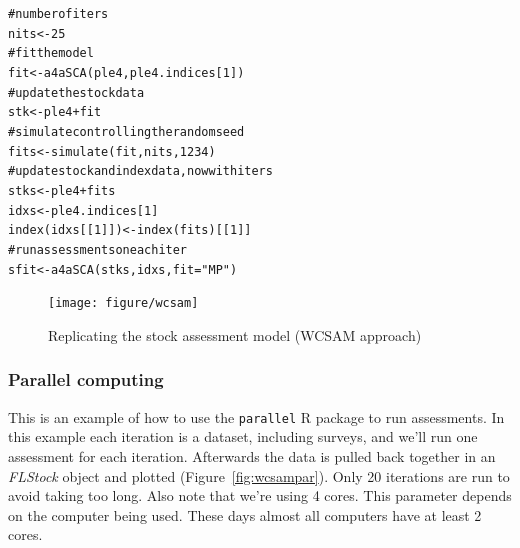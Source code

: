 \documentclass[a4paper,english,10pt]{article}\usepackage[]{graphicx}\usepackage[]{color}
\makeatletter
\newcommand{\hlnum}[1]{\textcolor[rgb]{0.2,0.2,0.2}{#1}}%
\newcommand{\hlstr}[1]{\textcolor[rgb]{0.2,0.2,0.2}{#1}}%
\newcommand{\hlcom}[1]{\textcolor[rgb]{0.2,0.267,0.4}{#1}}%
\newcommand{\hlopt}[1]{\textcolor[rgb]{0.2,0.2,0.2}{#1}}%
\newcommand{\hlstd}[1]{\textcolor[rgb]{0,0,0}{#1}}%
\newcommand{\hlkwb}[1]{\textcolor[rgb]{0.361,0.506,0.596}{#1}}%
\newcommand{\hlkwc}[1]{\textcolor[rgb]{0.361,0.506,0.596}{#1}}%
\newcommand{\hlkwd}[1]{\textcolor[rgb]{0.361,0.506,0.596}{#1}}%
\newenvironment{kframe}{%
 \def\at@end@of@kframe{}%
 \ifinner\ifhmode%
  \def\at@end@of@kframe{\end{minipage}}%
  \begin{minipage}{\columnwidth}%
 \fi\fi%
 \def\FrameCommand##1{\hskip\@totalleftmargin \hskip-\fboxsep
 \colorbox{shadecolor}{##1}\hskip-\fboxsep
     \hskip-\linewidth \hskip-\@totalleftmargin \hskip\columnwidth}%
 \MakeFramed {\advance\hsize-\width
   \@totalleftmargin\z@ \linewidth\hsize
   \@setminipage}}%
 {\par\unskip\endMakeFramed%
 \at@end@of@kframe}
\newenvironment{knitrout}{}{} %
\newcommand{\pkg}[1]{{\texttt{#1}}}
\newcommand{\class}[1]{{\textit{#1}}}
\makeatother
\begin{document}
\begin{knitrout}
\color{fgcolor}\begin{kframe}
\begin{alltt}
\hlcom{# number of iters}
\hlstd{nits} \hlkwb{<-} \hlnum{25}
\hlcom{# fit the model}
\hlstd{fit} \hlkwb{<-} \hlkwd{a4aSCA}\hlstd{(ple4, ple4.indices[}\hlnum{1}\hlstd{])}
\hlcom{# update the stock data}
\hlstd{stk} \hlkwb{<-} \hlstd{ple4} \hlopt{+} \hlstd{fit}
\hlcom{# simulate controlling the random seed}
\hlstd{fits} \hlkwb{<-} \hlkwd{simulate}\hlstd{(fit, nits,} \hlnum{1234}\hlstd{)}
\hlcom{# update stock and index data, now with iters}
\hlstd{stks} \hlkwb{<-} \hlstd{ple4} \hlopt{+} \hlstd{fits}
\hlstd{idxs} \hlkwb{<-} \hlstd{ple4.indices[}\hlnum{1}\hlstd{]}
\hlkwd{index}\hlstd{(idxs[[}\hlnum{1}\hlstd{]])} \hlkwb{<-} \hlkwd{index}\hlstd{(fits)[[}\hlnum{1}\hlstd{]]}
\hlcom{# run assessments on each iter}
\hlstd{sfit} \hlkwb{<-} \hlkwd{a4aSCA}\hlstd{(stks, idxs,} \hlkwc{fit}\hlstd{=}\hlstr{"MP"}\hlstd{)}
\end{alltt}
\end{kframe}
\end{knitrout}

\begin{knitrout}
\color{fgcolor}\begin{figure}[H]


{\centering \texttt{[image: figure/wcsam]} 

}

\caption[Replicating the stock assessment model (WCSAM approach)]{Replicating the stock assessment model (WCSAM approach)\label{fig:wcsam}}
\end{figure}


\end{knitrout}

\subsubsection{Parallel computing}

This is an example of how to use the \pkg{parallel} R package to run assessments. In this example each iteration is a dataset, including surveys, and we'll run one assessment for each iteration. Afterwards the data is pulled back together in an \class{FLStock} object and plotted (Figure~\ref{fig:wcsampar}). Only 20 iterations are run to avoid taking too long. Also note that we're using 4 cores. This parameter depends on the computer being used. These days almost all computers have at least 2 cores.
\end{document}
